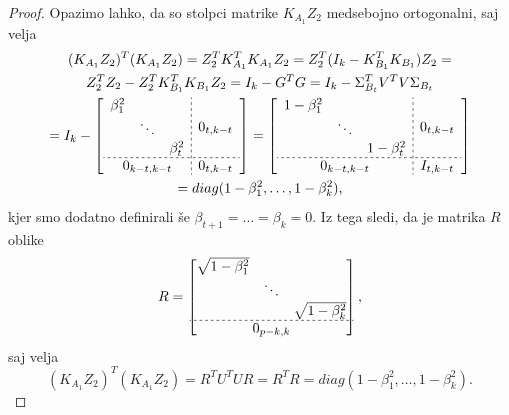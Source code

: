 \documentclass[mat1]{article}
\theoremstyle{definition}
\begin{document}
\begin{proof}

Opazimo lahko, da so stolpci matrike $K_{A_1} Z_2$ medsebojno ortogonalni, saj velja
\begin{gather*}
(K_{A_1} Z_2)^T (K_{A_1} Z_2) = Z_2^T K_{A_1}^T K_{A_1} Z_2 %
= Z_2^T (I_{k} - K_{B_1}^T K_{B_1}) Z_2 =
\\
Z_2^T Z_2 -  Z_2^T K_{B_1}^T K_{B_1} Z_2
= I_k - G^T G = I_k - \Sigma_{B_t}^T V^T V \Sigma_{B_t} 
\\
= I_k - 
\left[
\begin{array}{c;{2pt/2pt}c}
\begin{matrix}
\beta_1^2 & & \\
 & \ddots & \\
 & & \beta_t^2
\end{matrix} & 0_{t,k - t}
 \\ \hdashline[2pt/2pt]
0_{k - t, k - t} & 0_{t, k - t}
\end{array} \right] 
= 
\left[
\begin{array}{c;{2pt/2pt}c}
\begin{matrix}
1 - \beta_1^2 & & \\
 & \ddots & \\
 & & 1 - \beta_t^2
\end{matrix} & 0_{t,k - t}
 \\ \hdashline[2pt/2pt]
0_{k - t, k - t} & I_{t, k - t}
\end{array} \right]  
\\ 
= diag(1-\beta_1^2, \ldots, 1-\beta_k^2) \text{,}
\end{gather*}
kjer smo dodatno definirali še $\beta_{t+1} = \ldots = \beta_{k} = 0$. 
Iz tega sledi, da je matrika $R$ oblike 
$$ R = 
\begin{bmatrix}
\begin{matrix}
\sqrt{1 - \beta_1^2} & & \\
 & \ddots & \\
 & & \sqrt{1 - \beta_k^2}
\end{matrix} \\ \hdashline[2pt/2pt]
0_{p-k, k}
\end{bmatrix} \text{,}
$$ saj velja 
$$
(K_{A_1} Z_2)^T (K_{A_1} Z_2) = R^T U^T U R = R^T R = diag(1-\beta_1^2, \ldots, 1-\beta_k^2) \text{.}
$$
\end{proof}
\end{document}
